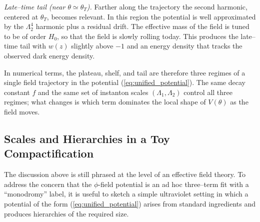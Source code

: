 \documentclass[a4paper,11pt]{article}
\begin{document}
\textit{Late–time tail (near $\theta \simeq \theta_T$).} Farther along the trajectory the second harmonic, centered at $\theta_T$, becomes relevant. In this region the potential is well approximated by the $\Lambda_2^4$ harmonic plus a residual drift. The effective mass of the field is tuned to be of order $H_0$, so that the field is slowly rolling today. This produces the late–time tail with $w(z)$ slightly above $-1$ and an energy density that tracks the observed dark energy density.

In numerical terms, the plateau, shelf, and tail are therefore three regimes of a single field trajectory in the potential (\ref{eq:unified_potential}). The same decay constant $f$ and the same set of instanton scales $(\Lambda_1, \Lambda_2)$ control all three regimes; what changes is which term dominates the local shape of $V(\theta)$ as the field moves.


\subsection{Scales and Hierarchies in a Toy Compactification}
\label{sec:toy_uv}

The discussion above is still phrased at the level of an effective field theory. To address the concern that the $\phi$-field potential is an ad hoc three–term fit with a ``monodromy'' label, it is useful to sketch a simple ultraviolet setting in which a potential of the form (\ref{eq:unified_potential}) arises from standard ingredients and produces hierarchies of the required size.
\end{document}
